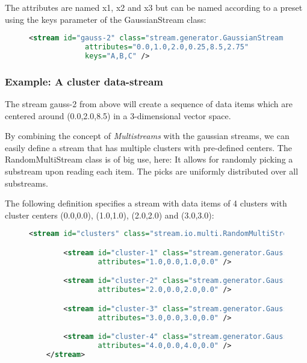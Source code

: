 The attributes are named {\ttfamily x1}, {\ttfamily x2} and {\ttfamily
  x3} but can be named according to a preset using the {\ttfamily keys}
parameter of the {\ttfamily GaussianStream} class:

\begin{figure}[h!]
  \centering
  \begin{lstlisting}[language=XML]
     <stream id="gauss-2" class="stream.generator.GaussianStream"
             attributes="0.0,1.0,2.0,0.25,8.5,2.75"
             keys="A,B,C" />
  \end{lstlisting}
\end{figure}

\subsubsection{Example: A cluster data-stream}
The stream {\ttfamily gauss-2} from above will create a sequence of
data items which are centered around (0.0,2.0,8.5) in a 3-dimensional
vector space.

By combining the concept of {\em Multistreams} with the gaussian
streams, we can easily define a stream that has multiple clusters with
pre-defined centers. The {\ttfamily RandomMultiStream} class is of big
use, here: It allows for randomly picking a substream upon reading
each item. The picks are uniformly distributed over all substreams.

The following definition specifies a stream with data items of 4
clusters with cluster centers (0.0,0.0), (1.0,1.0), (2.0,2.0) and
(3.0,3.0):

\begin{figure}[h!]
  \centering
  \begin{lstlisting}[language=XML]
    <stream id="clusters" class="stream.io.multi.RandomMultiStream">

        <stream id="cluster-1" class="stream.generator.GaussianStream"
                attributes="1.0,0.0,1.0,0.0" />

        <stream id="cluster-2" class="stream.generator.GaussianStream"
                attributes="2.0,0.0,2.0,0.0" />

        <stream id="cluster-3" class="stream.generator.GaussianStream"
                attributes="3.0,0.0,3.0,0.0" />

        <stream id="cluster-4" class="stream.generator.GaussianStream"
                attributes="4.0,0.0,4.0,0.0" />
    </stream>
  \end{lstlisting}
\end{figure}

